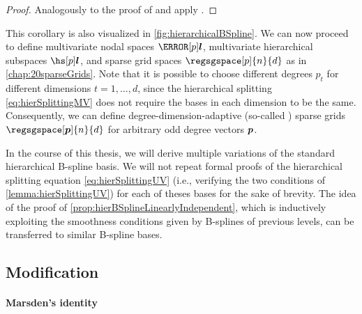 \begin{proof}
  Analogously to the proof of 
  and apply .
\end{proof}

\vspace{1em}

This corollary is also visualized in \cref{fig:hierarchicalBSpline}.
We can now proceed to define
multivariate nodal spaces $\nsbspl{\*l}{p}$,
multivariate hierarchical subspaces $\hsbspl{\*l}{p}$, and
sparse grid spaces $\regsgspace[p]{n}{d}$ as in \cref{chap:20sparseGrids}.
Note that it is possible to choose different degrees $p_t$ for
different dimensions $t = 1, \dotsc, d$,
since the hierarchical splitting \eqref{eq:hierSplittingMV} does not
require the bases in each dimension to be the same.
Consequently, we can define degree-dimension-adaptive
(so-called ) sparse grids
$\regsgspace[\*p]{n}{d}$ for arbitrary odd degree vectors ${\boldsymbol{p}}$.

In the course of this thesis, we will derive multiple variations
of the standard hierarchical B-spline basis.
We will not repeat formal proofs of the hierarchical splitting equation
\eqref{eq:hierSplittingUV}
(i.e., verifying the two conditions of \cref{lemma:hierSplittingUV})
for each of theses bases for the sake of brevity.
The idea of the proof of \cref{prop:hierBSplineLinearlyIndependent},
which is inductively exploiting the smoothness conditions given by
B-splines of previous levels, can be transferred to similar B-spline
bases.



\subsection{Modification}
\label{sec:313modification}

\paragraph{Marsden's identity}

